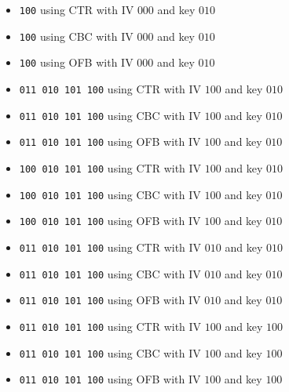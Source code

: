 \documentclass[12pt]{article}
\begin{document}
\begin{itemize}
\item {\tt 100} using CTR with IV $000$ and key $010$ \\
\item {\tt 100} using CBC with IV $000$ and key $010$ \\
\item {\tt 100} using OFB with IV $000$ and key $010$ \\
\item {\tt 011~010~101~100} using CTR with IV $100$ and key $010$ \\
\item {\tt 011~010~101~100} using CBC with IV $100$ and key $010$ \\
\item {\tt 011~010~101~100} using OFB with IV $100$ and key $010$ \\
\item {\tt 100~010~101~100} using CTR with IV $100$ and key $010$ \\
\item {\tt 100~010~101~100} using CBC with IV $100$ and key $010$ \\
\item {\tt 100~010~101~100} using OFB with IV $100$ and key $010$ \\
\item {\tt 011~010~101~100} using CTR with IV $010$ and key $010$ \\
\item {\tt 011~010~101~100} using CBC with IV $010$ and key $010$ \\
\item {\tt 011~010~101~100} using OFB with IV $010$ and key $010$ \\
\item {\tt 011~010~101~100} using CTR with IV $100$ and key $100$ \\
\item {\tt 011~010~101~100} using CBC with IV $100$ and key $100$ \\
\item {\tt 011~010~101~100} using OFB with IV $100$ and key $100$ \\
\end{itemize}
\end{document}
